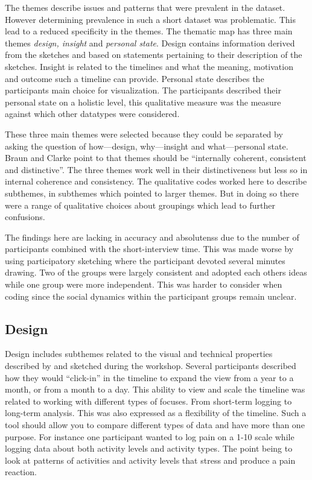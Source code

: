\documentclass[11pt,UKenglish, a4paper]{article}
\begin{document}
The themes describe issues and patterns that were prevalent in the dataset. However determining prevalence in such a short dataset was problematic. This lead to a reduced specificity in the themes. The thematic map has three main themes \textit{design, insight} and \textit{personal state}. Design contains information derived from the sketches and based on statements pertaining to their description of the sketches. Insight is related to the timelines and what the meaning, motivation and outcome such a timeline can provide. Personal state describes the participants main choice for visualization. The participants described their personal state on a holistic level, this qualitative measure was the measure against which other datatypes were considered.

These three main themes were selected because they could be separated by asking the question of how---design, why---insight and what---personal state. Braun and Clarke point to that themes should be ``internally coherent, consistent and distinctive''\cite[p.96]{Braun2006Using}. The three themes work well in their distinctiveness but less so in internal coherence and consistency. The qualitative codes worked here to describe subthemes, in subthemes which pointed to larger themes. But in doing so there were a range of qualitative choices about groupings which lead to further confusions.

The findings here are lacking in accuracy and absolutenss due to the number of participants combined with the short-interview time. This was made worse by using participatory sketching where the participant devoted several minutes drawing. Two of the groups were largely consistent and adopted each others ideas while one group were more independent. This was harder to consider when coding since the social dynamics within the participant groups remain unclear. 

\subsection{Design}
Design includes subthemes related to the visual and technical properties described by and sketched during the workshop. Several participants described how they would ``click-in'' in the timeline to expand the view from a year to a month, or from a month to a day. This ability to view and scale the timeline was related to working with different types of focuses. From short-term logging to long-term analysis. This was also expressed as a flexibility of the timeline. Such a tool should allow you to compare different types of data and have more than one purpose. For instance one participant wanted to log pain on a 1-10 scale while logging data about both activity levels and activity types. The point being to look at patterns of activities and activity levels that stress and produce a pain reaction.
\end{document}
